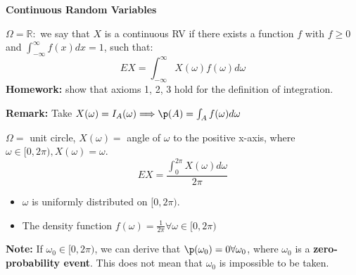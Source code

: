 \begin{exmp}
    \textbf{Continuous Random Variables}

    $\Omega = \mathbb{R}:$ we say that $X$ is a continuous RV if there exists a function $f$ with $f\geq 0$ and $\int_{-\infty}^{\infty} f(x)dx = 1$, such that:
    \begin{equation*}
        EX = \int_{-\infty}^{\infty}X(\omega)f(\omega)d\omega
    \end{equation*}
    \textbf{Homework:} show that axioms 1, 2, 3 hold for the definition of integration.
\end{exmp}

\textbf{Remark:} Take $X(\omega) = I_A(\omega) \Longrightarrow \p(A) = \int_Af(\omega)d\omega$

\begin{exmp}
    $\Omega =$ unit circle, $X(\omega) =$ angle of $\omega$ to the positive x-axis, where $\omega \in [0, 2\pi), X(\omega) = \omega$.
    \begin{equation*}
        EX = \frac{\int_0^{2\pi}X(\omega)d\omega}{2\pi}
    \end{equation*}
    \begin{itemize}
        \item $\omega$ is uniformly distributed on $[0, 2\pi)$.
        \item The density function $f(\omega) = \frac{1}{2\pi} \forall \omega\in[0, 2\pi)$
    \end{itemize}
\end{exmp}

\textbf{Note:} If $\omega_0 \in [0, 2\pi)$, we can derive that $\p(\omega_0) = 0 \forall \omega_0$, where $\omega_0$ is a \textbf{zero-probability event}. This does not mean that $\omega_0$ is impossible to be taken.